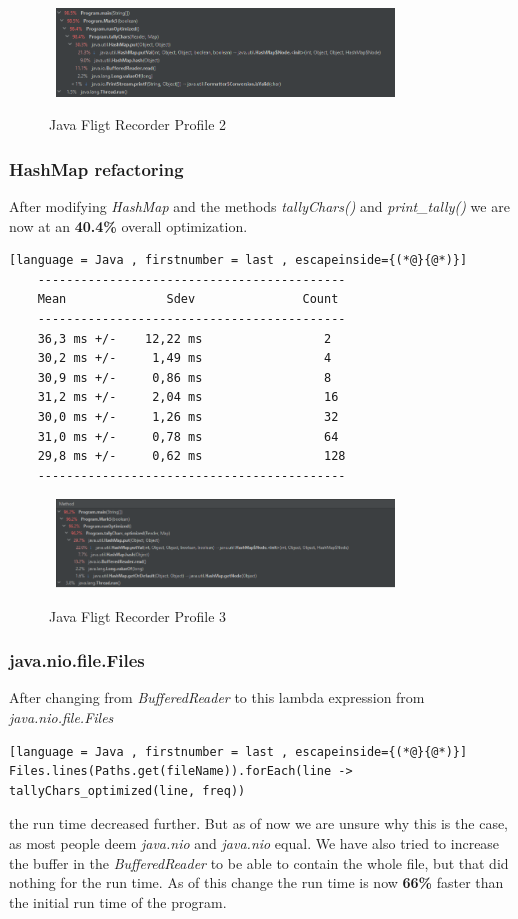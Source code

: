 \begin{figure}[H]
    \centering\
    \includegraphics[width = 0.8\textwidth ]{figures/profile2.PNG}
    \caption{Java Fligt Recorder Profile 2}
    \label{fig:p2}
\end{figure}

\newpage
\subsubsection{HashMap refactoring}
\label{sec:2.6.2}
After modifying \emph{HashMap} and the methods \emph{tallyChars()} and \emph{print\_tally()} we are now at an \textbf{40.4\%} overall optimization.
\begin{lstlisting}[language = Java , firstnumber = last , escapeinside={(*@}{@*)}]
    -------------------------------------------
    Mean              Sdev               Count
    -------------------------------------------
    36,3 ms +/-    12,22 ms                 2
    30,2 ms +/-     1,49 ms                 4
    30,9 ms +/-     0,86 ms                 8
    31,2 ms +/-     2,04 ms                 16
    30,0 ms +/-     1,26 ms                 32
    31,0 ms +/-     0,78 ms                 64
    29,8 ms +/-     0,62 ms                 128
    -------------------------------------------
\end{lstlisting}

\begin{figure}[H]
    \centering\
    \includegraphics[width = 0.8\textwidth ]{figures/profile3.PNG}
    \caption{Java Fligt Recorder Profile 3}
    \label{fig:p3}
\end{figure}

\subsubsection{java.nio.file.Files}
\label{sec:2.6.3}

After changing from \emph{BufferedReader} to this lambda expression from \emph{java.nio.file.Files} \begin{lstlisting}[language = Java , firstnumber = last , escapeinside={(*@}{@*)}]
Files.lines(Paths.get(fileName)).forEach(line -> tallyChars_optimized(line, freq))
\end{lstlisting} the run time decreased further. But as of now we are unsure why this is the case, as most people deem \emph{java.nio} and \emph{java.nio} equal. We have also tried to increase the buffer in the \emph{BufferedReader} to be able to contain the whole file, but that did nothing for the run time. As of this change the run time is now \textbf{66\%} faster than the initial run time of the program.

